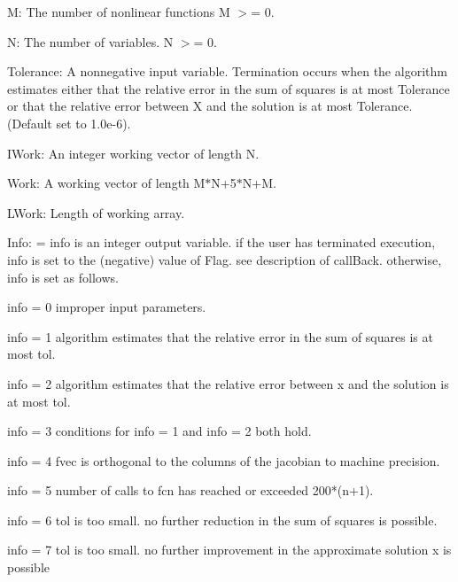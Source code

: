 \begin{DoxyItemize}
\item M\-: The number of nonlinear functions M $>$= 0.
\item N\-: The number of variables. N $>$= 0.
\item Tolerance\-: A nonnegative input variable. Termination occurs when the algorithm estimates either that the relative error in the sum of squares is at most Tolerance or that the relative error between X and the solution is at most Tolerance. (Default set to 1.\-0e-\/6).
\item I\-Work\-: An integer working vector of length N.
\item Work\-: A working vector of length M$\ast$\-N+5$\ast$\-N+\-M.
\item L\-Work\-: Length of working array.
\item Info\-: = info is an integer output variable. if the user has terminated execution, info is set to the (negative) value of Flag. see description of call\-Back. otherwise, info is set as follows. \begin{DoxyVerb}info = 0  improper input parameters.

info = 1  algorithm estimates that the relative error
          in the sum of squares is at most tol.

info = 2  algorithm estimates that the relative error
          between x and the solution is at most tol.

info = 3  conditions for info = 1 and info = 2 both hold.

info = 4  fvec is orthogonal to the columns of the
          jacobian to machine precision.

info = 5  number of calls to fcn has reached or
          exceeded 200*(n+1).

info = 6  tol is too small. no further reduction in
          the sum of squares is possible.

info = 7  tol is too small. no further improvement in
          the approximate solution x is possible
\end{DoxyVerb}

\end{DoxyItemize}


